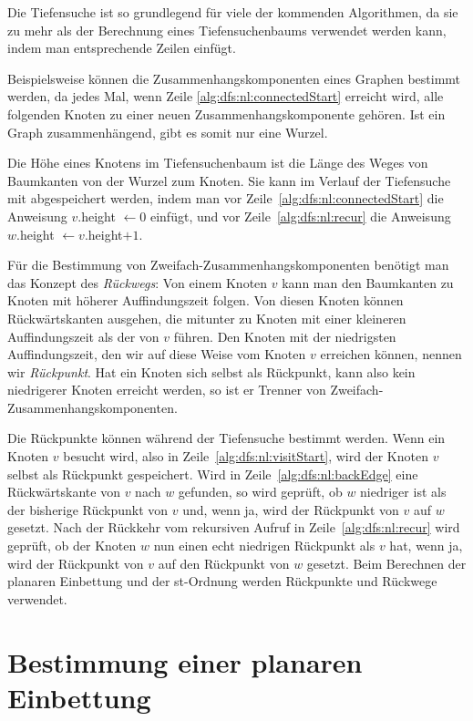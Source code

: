 \documentclass[a4paper]{scrreprt}
\theoremstyle{definition}
\begin{document}
Die Tiefensuche ist so grundlegend für viele der kommenden Algorithmen, da sie zu mehr als der Berechnung eines Tiefensuchenbaums verwendet werden kann, indem man entsprechende Zeilen einfügt. 

Beispielsweise können die Zusammenhangskomponenten eines Graphen bestimmt werden, da jedes Mal, wenn Zeile \ref{alg:dfs:nl:connectedStart} erreicht wird, alle folgenden Knoten zu einer neuen Zusammenhangskomponente gehören. Ist ein Graph zusammenhängend, gibt es somit nur eine Wurzel.

Die Höhe eines Knotens im Tiefensuchenbaum ist die Länge des Weges von Baumkanten von der Wurzel zum Knoten. Sie kann im Verlauf der Tiefensuche mit abgespeichert werden, indem man vor Zeile~\ref{alg:dfs:nl:connectedStart} die Anweisung $v.$height $\leftarrow 0$ einfügt, und vor Zeile~\ref{alg:dfs:nl:recur} die Anweisung $w.$height $\leftarrow v.$height$ + 1$.


Für die Bestimmung von Zweifach-Zusammenhangskomponenten benötigt man das Konzept des \emph{Rückwegs}: Von einem Knoten $v$ kann man den Baumkanten zu Knoten mit höherer Auffindungszeit folgen. Von diesen Knoten können Rückwärtskanten ausgehen, die mitunter zu Knoten mit einer kleineren Auffindungszeit als der von $v$ führen. Den Knoten mit der niedrigsten Auffindungszeit, den wir auf diese Weise vom Knoten $v$ erreichen können, nennen wir \emph{Rückpunkt}. Hat ein Knoten sich selbst als Rückpunkt, kann also kein niedrigerer Knoten erreicht werden, so ist er Trenner von Zweifach-Zusammenhangskomponenten.

Die Rückpunkte können während der Tiefensuche bestimmt werden. Wenn ein Knoten $v$ besucht wird, also in Zeile~\ref{alg:dfs:nl:visitStart}, wird der Knoten $v$ selbst als Rückpunkt gespeichert. Wird in Zeile~\ref{alg:dfs:nl:backEdge} eine Rückwärtskante von $v$ nach $w$ gefunden, so wird geprüft, ob $w$ niedriger ist als der bisherige Rückpunkt von $v$ und, wenn ja, wird der Rückpunkt von $v$ auf $w$ gesetzt. Nach der Rückkehr vom rekursiven Aufruf in Zeile~\ref{alg:dfs:nl:recur} wird geprüft, ob der Knoten $w$ nun einen echt niedrigen Rückpunkt als $v$ hat, wenn ja, wird der Rückpunkt von $v$ auf den Rückpunkt von $w$ gesetzt. Beim Berechnen der planaren Einbettung und der st-Ordnung werden Rückpunkte und Rückwege verwendet.

\section{Bestimmung einer planaren Einbettung}
\end{document}
